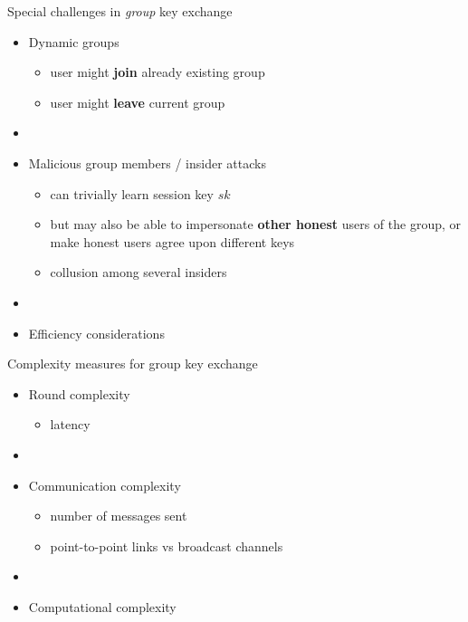 \documentclass[screen, aspectratio=43,compress,dvipsnames]{beamer}
\begin{document}
\begin{frame}{Special challenges in \emph{group} key exchange}
	\begin{itemize}
			
		\item Dynamic groups 
			\begin{itemize}
				\item user might \textbf{join} already existing group 
				
				\item user might \textbf{leave} current group
			\end{itemize}
		
		\item[]

		\item Malicious group members / insider attacks
			\begin{itemize}
				\item can trivially learn session key $sk$ 
				
				\item but may also be able to impersonate \textbf{other honest} users of the group, 
				or  make honest users agree upon different keys
			
				\item collusion among several insiders
			\end{itemize}
	
		\item[]
		
		\item Efficiency considerations
	
	\end{itemize}

\end{frame}


\begin{frame}{Complexity measures for group key exchange}
	\begin{itemize}
		\item  Round complexity
		\begin{itemize}
			\item latency 
		\end{itemize}
		
		\item[]
		
		\item Communication complexity
		\begin{itemize}
			\item number of messages sent 
			\item point-to-point links vs broadcast channels
		\end{itemize}
		
		\item[]
		
		\item Computational complexity
	\end{itemize}
\end{frame}
\end{document}
